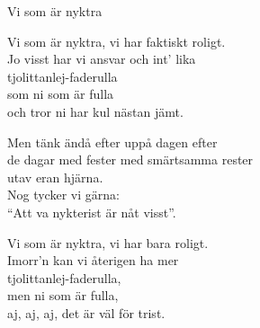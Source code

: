 \begin{song}{Vi som är nyktra}

	
	Vi som är nyktra, vi har faktiskt roligt.\\
	Jo visst har vi ansvar och int' lika\\
	tjolittanlej-faderulla\\
	som ni som är fulla\\
	och tror ni har kul nästan jämt.
	
	Men tänk ändå efter uppå dagen efter\\
	de dagar med fester med smärtsamma rester\\
	utav eran hjärna.\\
	Nog tycker vi gärna:\\
	``Att va nykterist är nåt visst''.
	
	Vi som är nyktra, vi har bara roligt.\\
	Imorr'n kan vi återigen ha mer\\
	tjolittanlej-faderulla,\\
	men ni som är fulla,\\
	aj, aj, aj, det är väl för trist.
	
\end{song}
